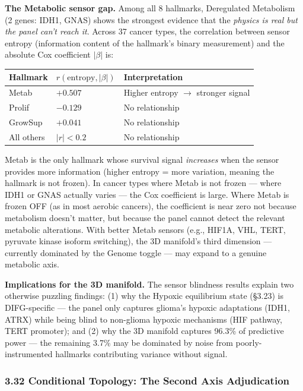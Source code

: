\documentclass[
  11pt,
]{article}
\newcounter{none} %
\begin{document}
\textbf{The Metabolic sensor gap.} Among all 8 hallmarks, Deregulated
Metabolism (2 genes: IDH1, GNAS) shows the strongest evidence that the
\emph{physics is real but the panel can't reach it}. Across 37 cancer
types, the correlation between sensor entropy (information content of
the hallmark's binary measurement) and the absolute Cox coefficient
\(|\beta|\) is:

{\def\LTcaptype{none} %
\begin{longtable}[]{@{}lll@{}}
\toprule\noalign{}
Hallmark & \(r(\mathrm{entropy}, |\beta|)\) & Interpretation \\
\midrule\noalign{}
\endhead
\bottomrule\noalign{}
\endlastfoot
Metab & \(+0.507\) & Higher entropy \(\to\) stronger signal \\
Prolif & \(-0.129\) & No relationship \\
GrowSup & \(+0.041\) & No relationship \\
All others & \(|r| < 0.2\) & No relationship \\
\end{longtable}
}

Metab is the only hallmark whose survival signal \emph{increases} when
the sensor provides more information (higher entropy = more variation,
meaning the hallmark is not frozen). In cancer types where Metab is not
frozen --- where IDH1 or GNAS actually varies --- the Cox coefficient is
large. Where Metab is frozen OFF (as in most aerobic cancers), the
coefficient is near zero not because metabolism doesn't matter, but
because the panel cannot detect the relevant metabolic alterations. With
better Metab sensors (e.g., HIF1A, VHL, TERT, pyruvate kinase isoform
switching), the 3D manifold's third dimension --- currently dominated by
the Genome toggle --- may expand to a genuine metabolic axis.

\textbf{Implications for the 3D manifold.} The sensor blindness results
explain two otherwise puzzling findings: (1) why the Hypoxic equilibrium
state (§3.23) is DIFG-specific --- the panel only captures glioma's
hypoxic adaptations (IDH1, ATRX) while being blind to non-glioma hypoxic
mechanisms (HIF pathway, TERT promoter); and (2) why the 3D manifold
captures 96.3\% of predictive power --- the remaining 3.7\% may be
dominated by noise from poorly-instrumented hallmarks contributing
variance without signal.

\subsubsection{3.32 Conditional Topology: The Second Axis
Adjudication}\label{conditional-topology-the-second-axis-adjudication}
\end{document}
